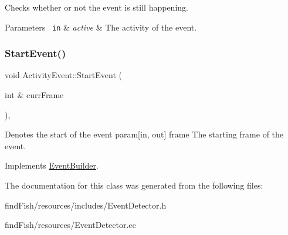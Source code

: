 Checks whether or not the event is still happening. 
\begin{DoxyParams}[1]{Parameters}
\mbox{\texttt{ in}}  & {\em active} & The activity of the event. \\
\hline
\end{DoxyParams}
\mbox{\label{class_activity_event_a949f9ddfc7c259c1b46a38bc9e1a7d47}} 
\subsubsection{\texorpdfstring{StartEvent()}{StartEvent()}}
{\footnotesize\ttfamily void Activity\+Event\+::\+Start\+Event (\begin{DoxyParamCaption}\item[{int \&}]{curr\+Frame }\end{DoxyParamCaption})\hspace{0.3cm}{\ttfamily [override]}, {\ttfamily [virtual]}}

Denotes the start of the event param\mbox{[}in, out\mbox{]} frame The starting frame of the event. 

Implements \mbox{\hyperlink{class_event_builder_a62435c441382ebf14191b5b0c17904e3}{Event\+Builder}}.



The documentation for this class was generated from the following files\+:\begin{DoxyCompactItemize}
\item 
find\+Fish/resources/includes/Event\+Detector.\+h\item 
find\+Fish/resources/Event\+Detector.\+cc\end{DoxyCompactItemize}
